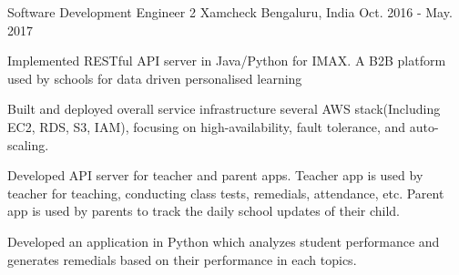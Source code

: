 \begin{cventries}
  \cventry
    {Software Development Engineer 2} %
    {Xamcheck} %
    {Bengaluru, India} %
    {Oct. 2016 - May. 2017} %
    {
      \begin{cvitems} %
        \item {Implemented RESTful API server in Java/Python for IMAX. A B2B platform used by schools for data driven personalised learning}
        \item {Built and deployed overall service infrastructure several AWS stack(Including EC2, RDS, S3, IAM), focusing on high-availability, fault tolerance, and auto-scaling.}
        \item {Developed API server for teacher and parent apps. Teacher app is used by teacher for teaching, conducting class tests, remedials, attendance, etc. Parent app is used by parents to track the daily school updates of their child.}
        \item {Developed an application in Python which analyzes student performance and generates remedials based on their performance in each topics.}
      \end{cvitems}
    }


\end{cventries}
